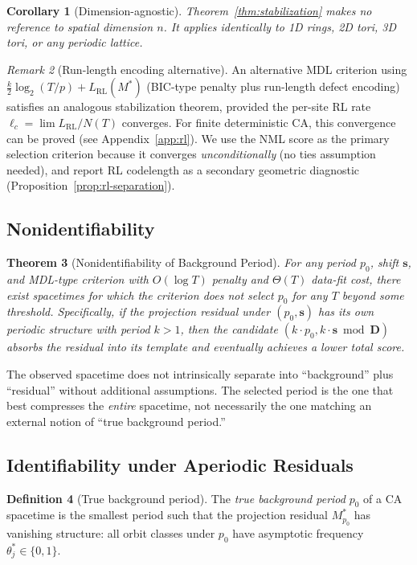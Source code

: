 \documentclass[11pt]{article}
\newtheorem{theorem}{Theorem}
\newtheorem{corollary}[theorem]{Corollary}
\theoremstyle{definition}
\newtheorem{definition}[theorem]{Definition}
\theoremstyle{remark}
\newtheorem{remark}[theorem]{Remark}
\newcommand{\bs}{\mathbf{s}}
\newcommand{\bD}{\mathbf{D}}
\newcommand{\RL}{\operatorname{RL}}
\begin{document}
\begin{corollary}[Dimension-agnostic]
Theorem~\ref{thm:stabilization} makes no reference to spatial dimension $n$.
It applies identically to 1D rings, 2D tori, 3D tori, or any periodic lattice.
\end{corollary}

\begin{remark}[Run-length encoding alternative]\label{rem:rl}
An alternative MDL criterion using $\frac{k}{2} \log_2(T/p) + L_{\RL}(M^*)$ (BIC-type penalty plus run-length defect encoding) satisfies an analogous stabilization theorem, provided the per-site RL rate $\ell_c = \lim L_{\RL} / N(T)$ converges.
For finite deterministic CA, this convergence can be proved (see Appendix~\ref{app:rl}).
We use the NML score as the primary selection criterion because it converges \emph{unconditionally} (no ties assumption needed), and report RL codelength as a secondary geometric diagnostic (Proposition~\ref{prop:rl-separation}).
\end{remark}

\subsection{Nonidentifiability}

\begin{theorem}[Nonidentifiability of Background Period]\label{thm:nonident}
For any period $p_0$, shift $\bs$, and MDL-type criterion with $O(\log T)$ penalty and $\Theta(T)$ data-fit cost, there exist spacetimes for which the criterion does not select $p_0$ for any $T$ beyond some threshold.
Specifically, if the projection residual under $(p_0, \bs)$ has its own periodic structure with period $k > 1$, then the candidate $(k \cdot p_0, k \cdot \bs \bmod \bD)$ absorbs the residual into its template and eventually achieves a lower total score.
\end{theorem}

The observed spacetime does not intrinsically separate into ``background'' plus ``residual'' without additional assumptions.
The selected period is the one that best compresses the \emph{entire} spacetime, not necessarily the one matching an external notion of ``true background period.''

\subsection{Identifiability under Aperiodic Residuals}

\begin{definition}[True background period]\label{def:truep}
The \emph{true background period} $p_0$ of a CA spacetime is the smallest period such that the projection residual $M^*_{p_0}$ has vanishing structure: all orbit classes under $p_0$ have asymptotic frequency $\theta_j^* \in \{0, 1\}$.
\end{definition}
\end{document}
